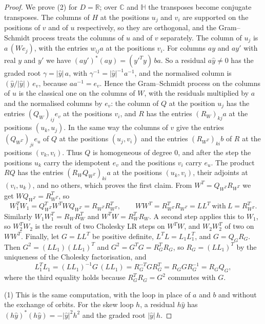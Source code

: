\documentclass[12pt, a4paper]{report}
\theoremstyle{plain}
\theoremstyle{definition}
\theoremstyle{remark}
\theoremstyle{plain}
\newcommand{\RR}{\mathbb{R}}
\newcommand{\CC}{\mathbb{C}}
\newcommand{\HH}{\mathbb{H}}
\begin{document}
\begin{proof}
We prove (2) for $D=\RR$; over $\CC$ and $\HH$ the transposes become conjugate transposes. The columns of $H$ at the positions $u_j$ and $v_i$ are supported on the positions of $v$ and of $u$ respectively, so they are orthogonal, and the Gram--Schmidt process treats the columns of $u$ and of $v$ separately. The column of $u_j$ is $a\,(We_j)$, with the entries $w_{ij}a$ at the positions $v_i$. For columns $ay$ and $ay'$ with real $y$ and $y'$ we have $(ay')^*(ay)=(y'^Ty)\,ba$. So a residual $a\hat y\neq0$ has the graded root $\gamma=|\hat y|\,a$, with $\gamma^{-1}=|\hat y|^{-1}a^{-1}$, and the normalised column is $(\hat y/|\hat y|)\,e_v$, because $aa^{-1}=e_v$. Hence the Gram--Schmidt process on the columns of $u$ is the classical one on the columns of $W$, with the residuals multiplied by $a$ and the normalised columns by $e_v$: the column of $Q$ at the position $u_j$ has the entries $(Q_W)_{ij}e_v$ at the positions $v_i$, and $R$ has the entries $(R_W)_{kj}a$ at the positions $(u_k,u_j)$. In the same way the columns of $v$ give the entries $(Q_{W^T})_{ji}e_u$ of $Q$ at the positions $(u_j,v_i)$ and the entries $(R_{W^T})_{ki}b$ of $R$ at the positions $(v_k,v_i)$. Thus $Q$ is homogeneous of degree $0$, and after the step the positions $u_k$ carry the idempotent $e_v$ and the positions $v_i$ carry $e_u$. The product $RQ$ has the entries $(R_WQ_{W^T})_{ki}a$ at the positions $(u_k,v_i)$, their adjoints at $(v_i,u_k)$, and no others, which proves the first claim. From $W^T=Q_{W^T}R_{W^T}$ we get $WQ_{W^T}=R_{W^T}^T$, so
\[ W_1^TW_1=Q_{W^T}^TW^TWQ_{W^T}=R_{W^T}R_{W^T}^T,\qquad WW^T=R_{W^T}^TR_{W^T}=LL^T\ \text{with}\ L=R_{W^T}^T . \]
Similarly $W_1W_1^T=R_WR_W^T$ and $W^TW=R_W^TR_W$. A second step applies this to $W_1$, so $W_2^TW_2$ is the result of two Cholesky LR steps on $W^TW$, and $W_2W_2^T$ of two on $WW^T$. Finally, let $G=LL^T$ be positive definite, $L^TL=L_1L_1^T$, and $G=Q_GR_G$. Then $G^2=(LL_1)(LL_1)^T$ and $G^2=G^TG=R_G^TR_G$, so $R_G=(LL_1)^T$ by the uniqueness of the Cholesky factorisation, and
\[ L_1^TL_1=(LL_1)^{-1}G\,(LL_1)=R_G^{-T}GR_G^T=R_GGR_G^{-1}=R_GQ_G , \]
where the third equality holds because $R_G^TR_G=G^2$ commutes with $G$.

(1) This is the same computation, with the loop in place of $a$ and $b$ and without the exchange of orbits. For the skew loop $h$, a residual $h\hat y$ has $(h\hat y)^*(h\hat y)=-|\hat y|^2h^2$ and the graded root $|\hat y|\,h$.


\end{proof}
\end{document}
